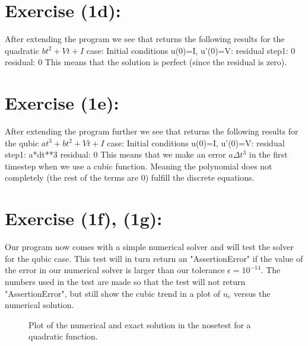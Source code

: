\documentclass{article}
\begin{document}
\section{Exercise (1d):}
\label{sec:1d}
After extending the program we see that returns the following results for the quadratic $bt^2 + Vt + I$ case:
\newline
\newline
Initial conditions u(0)=I, u'(0)=V:
\newline
residual step1: 0
\newline
residual: 0
\newline
\newline
This means that the solution is perfect (since the residual is zero).

\section{Exercise (1e):}
\label{sec:1e}
After extending the program further we see that returns the following results for the qubic $at^3 + bt^2 + Vt + I$ case:
\newline
\newline
Initial conditions u(0)=I, u'(0)=V:
\newline
residual step1: a*dt**3
\newline
residual: 0
\newline
\newline
This means that we make an error $a\Delta t^3$ in the first timestep when we use a cubic function. Meaning the polynomial does not completely (the rest of the terms are 0) fulfill the discrete equations.


\section{Exercise (1f), (1g):}
\label{sec:1f}
Our program now comes with a simple numerical solver and will test the solver for the qubic case. This test will in turn return an "AssertionError" if the value of the error in our numerical solver is larger than our tolerance $\epsilon = 10^{-14}$. The numbers used in the test are made so that the test will not return "AssertionError", but still show the cubic trend in a plot of $u_e$ versus the numerical solution.

\begin{figure}[H]
\mbox{}
\caption{Plot of the numerical and exact solution in the nosetest for a quadratic function.}
\label{fig:fig5}
\end{figure}
\end{document}
